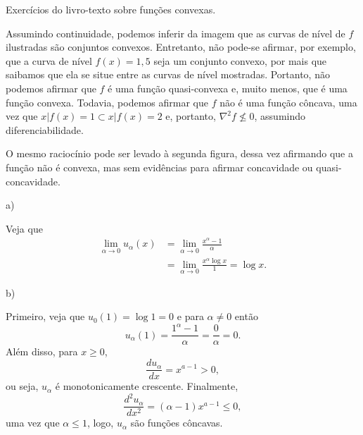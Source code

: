 \documentclass[a4paper]{report}
\begin{document}

Exercícios do livro-texto sobre funções convexas.


Assumindo continuidade, podemos inferir da imagem que as curvas de nível de $f$ ilustradas são conjuntos convexos.
Entretanto, não pode-se afirmar, por exemplo, que a curva de nível $f(x)=1,5$ seja um conjunto convexo, por mais que saibamos que ela se situe entre as curvas de nível mostradas.
Portanto, não podemos afirmar que $f$ é uma função quasi-convexa e, muito menos, que é uma função convexa.
Todavia, podemos afirmar que $f$ não é uma função côncava, uma vez que ${x|f(x)=1} \subset {x|f(x)=2}$ e, portanto, $\nabla^2 f \not\le 0$, assumindo diferenciabilidade.

O mesmo raciocínio pode ser levado à segunda figura, dessa vez afirmando que a função não é convexa, mas sem evidências para afirmar concavidade ou quasi-concavidade.


a)

Veja que
\begin{align*}
    \lim_{\alpha \to 0} u_\alpha\left( x \right) &= \lim_{\alpha \to 0} \frac{x^{\alpha}-1}{\alpha} \\
     &= \lim_{\alpha \to 0} \frac{x^{\alpha}\log x}{1} = \log x
.\end{align*}

b) 

Primeiro, veja que $u_0\left( 1 \right) = \log 1 = 0$ e para $\alpha\neq 0$ então \[
u_\alpha(1) = \frac{1^{\alpha}-1}{\alpha} = \frac{0}{\alpha} = 0
.\] 
Além disso, para $x\ge 0$, \[
\frac{d u_\alpha}{d x} = x^{a-1} > 0
,\] ou seja, $u_\alpha$ é monotonicamente crescente.
Finalmente, \[
\frac{d^2 u_\alpha}{d x^2} = \left( \alpha-1 \right) x^{a-1} \le  0
,\] uma vez que $\alpha \le 1$, logo, $u_\alpha$ são funções côncavas.
\end{document}
